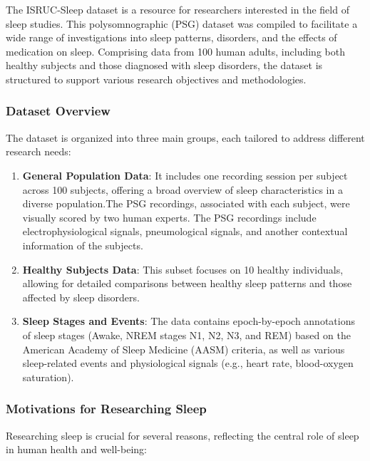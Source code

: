 \documentclass[
]{article}
\begin{document}
The ISRUC-Sleep dataset is a resource for researchers interested in the
field of sleep studies. This polysomnographic (PSG) dataset was compiled
to facilitate a wide range of investigations into sleep patterns,
disorders, and the effects of medication on sleep. Comprising data from
100 human adults, including both healthy subjects and those diagnosed
with sleep disorders, the dataset is structured to support various
research objectives and methodologies.

\hypertarget{dataset-overview}{%
\subsubsection{Dataset Overview}\label{dataset-overview}}

The dataset is organized into three main groups, each tailored to
address different research needs:

\begin{enumerate}
\def\labelenumi{\arabic{enumi}.}
\item
  \textbf{General Population Data}: It includes one recording session
  per subject across 100 subjects, offering a broad overview of sleep
  characteristics in a diverse population.The PSG recordings, associated
  with each subject, were visually scored by two human experts. The PSG
  recordings include electrophysiological signals, pneumological
  signals, and another contextual information of the subjects.
\item
  \textbf{Healthy Subjects Data}: This subset focuses on 10 healthy
  individuals, allowing for detailed comparisons between healthy sleep
  patterns and those affected by sleep disorders.
\item
  \textbf{Sleep Stages and Events}: The data contains epoch-by-epoch
  annotations of sleep stages (Awake, NREM stages N1, N2, N3, and REM)
  based on the American Academy of Sleep Medicine (AASM) criteria, as
  well as various sleep-related events and physiological signals (e.g.,
  heart rate, blood-oxygen saturation).
\end{enumerate}

\hypertarget{motivations-for-researching-sleep}{%
\subsubsection{Motivations for Researching
Sleep}\label{motivations-for-researching-sleep}}

Researching sleep is crucial for several reasons, reflecting the central
role of sleep in human health and well-being:
\end{document}
